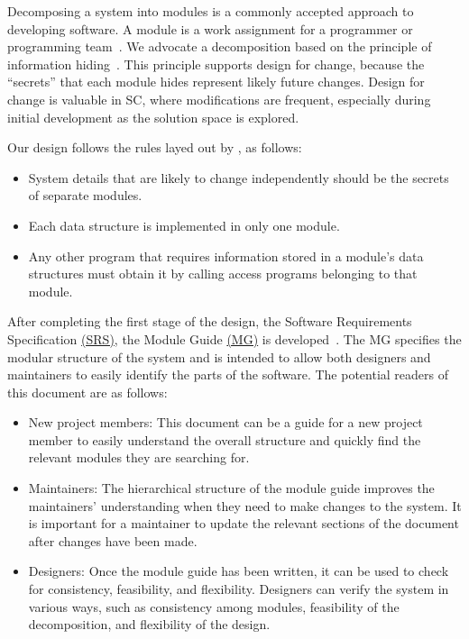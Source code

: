 \documentclass[12pt, titlepage]{article}
\begin{document}
Decomposing a system into modules is a commonly accepted approach to developing
software.  A module is a work assignment for a programmer or programming
team~\citep{ParnasEtAl1984}.  We advocate a decomposition
based on the principle of information hiding~\citep{Parnas1972a}.  This
principle supports design for change, because the ``secrets'' that each module
hides represent likely future changes.  Design for change is valuable in SC,
where modifications are frequent, especially during initial development as the
solution space is explored.  

Our design follows the rules layed out by \citet{ParnasEtAl1984}, as follows:
\begin{itemize}
\item System details that are likely to change independently should be the
  secrets of separate modules.
\item Each data structure is implemented in only one module.
\item Any other program that requires information stored in a module's data
  structures must obtain it by calling access programs belonging to that module.
\end{itemize}

After completing the first stage of the design, the Software Requirements
Specification \href{https://github.com/tusharagg1/chest-x-ray-ai/blob/main/docs/SRS/SRS.pdf}{(SRS)}, the Module Guide \href{https://github.com/tusharagg1/chest-x-ray-ai/blob/main/docs/Design/SoftArchitecture/MG.pdf}{(MG)} is developed~\citep{ParnasEtAl1984}. The MG
specifies the modular structure of the system and is intended to allow both
designers and maintainers to easily identify the parts of the software.  The
potential readers of this document are as follows:

\begin{itemize}
\item New project members: This document can be a guide for a new project member
  to easily understand the overall structure and quickly find the
  relevant modules they are searching for.
\item Maintainers: The hierarchical structure of the module guide improves the
  maintainers' understanding when they need to make changes to the system. It is
  important for a maintainer to update the relevant sections of the document
  after changes have been made.
\item Designers: Once the module guide has been written, it can be used to
  check for consistency, feasibility, and flexibility. Designers can verify the
  system in various ways, such as consistency among modules, feasibility of the
  decomposition, and flexibility of the design.
\end{itemize}
\end{document}
